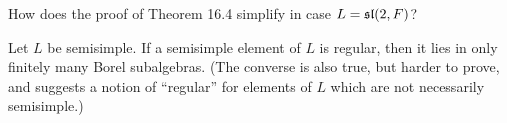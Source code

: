 \begin{ex}
  How does the proof of Theorem 16.4 simplify in case $L = \sl(2, F)$?
\end{ex}

\begin{ex}
  Let $L$ be semisimple. If a semisimple element of $L$ is regular, then it lies in only finitely many Borel subalgebras. (The converse is also true, but harder to prove, and suggests a notion of ``regular'' for elements of $L$ which are not necessarily semisimple.)
\end{ex}